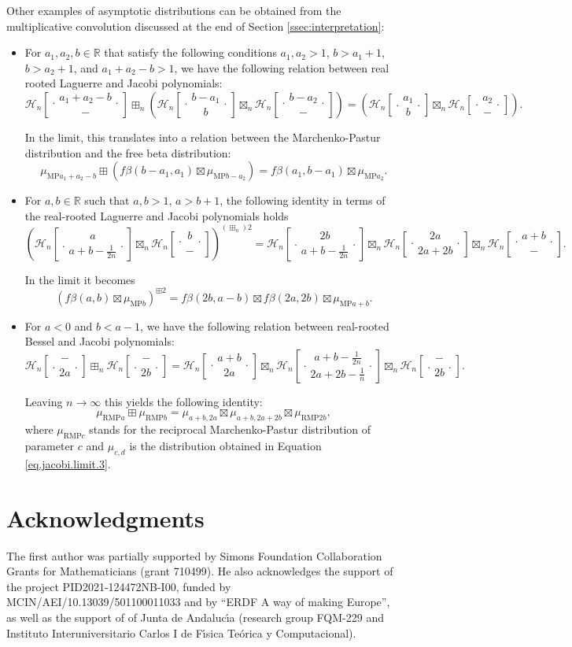 \documentclass[reqno,11pt]{amsart}
\theoremstyle{remark}
\newcommand{\rr}{\mathbb{R}}
\newcommand*\HGP[3]{%
 \mathcal{H}_{#1}{\left[\genfrac..{0pt}{1}{#2}{#3}\right]}%
}
\begin{document}
Other examples of asymptotic distributions can be obtained from the multiplicative convolution discussed at the end of Section \ref{ssec:interpretation}:
\begin{itemize}
\item For $a_1, a_2, b\in \rr$ that satisfy the following conditions $a_1,a_2>1$, $b>a_1+1$, $b>a_2+1$, and $a_1+a_2-b>1$, we have the following relation between  real rooted Laguerre and Jacobi polynomials:
$$\HGP{n}{a_1+a_2-b}{-} \boxplus_n \left(\HGP{n}{b-a_1}{b} \boxtimes_n \HGP{n}{b-a_2}{-}\right) = (\HGP{n}{a_1}{b} \boxtimes_n \HGP{n}{a_2}{-}).$$

In the limit, this translates into a relation between the Marchenko-Pastur distribution and the free beta distribution:
$$\mu_{\text{MP}a_1+a_2-b} \boxplus (f\beta(b-a_1,a_1) \boxtimes \mu_{\text{MP}b-a_2}) = f\beta(a_1,b-a_1) \boxtimes \mu_{\text{MP}a_2}.$$

\item 
For $a, b\in \rr$ such that $a,b>1$, $a>b+1$, the following identity in terms of the real-rooted Laguerre and Jacobi polynomials holds
$$\left( \HGP{n}{a}{a+b-\tfrac{1}{2n}} \boxtimes_n \HGP{n}{b}{-}  \right) ^{(\boxplus_n) 2}  = \HGP{n}{2b}{a+b-\tfrac{1}{2n}} \boxtimes_n \HGP{n}{2a}{2a+2b} \boxtimes_n  \HGP{n}{a+b}{-}.$$

In the limit it becomes  
$$ 
(f\beta(a,b)\boxtimes \mu_{\text{MP}b} )^{\boxplus 2} = f\beta(2b,a-b) \boxtimes f\beta(2a,2b) \boxtimes \mu_{\text{MP}a+b}.
$$

\item For $a<0$ and $b<a-1$, we have the following relation between real-rooted Bessel and Jacobi polynomials:
$$\HGP{n}{-}{2a} \boxplus_n \HGP{n}{-}{2b} = \HGP{n}{a+b}{2a}\boxtimes_n \HGP{n}{a+b-\tfrac{1}{2n}}{2a+2b-\tfrac{1}{n}} \boxtimes_n \HGP{n}{-}{2b}.$$

Leaving $n\to \infty$ this yields the following identity:
$$\mu_{\text{RMP}a} \boxplus \mu_{\text{RMP}b} = \mu_{a+b,2a} \boxtimes \mu_{a+b, 2a+2b} \boxtimes \mu_{\text{RMP}2b},$$
where $\mu_{\text{RMP}c}$ stands for the reciprocal Marchenko-Pastur distribution of parameter $c$ and $\mu_{c,d}$ is the distribution obtained in Equation \eqref{eq.jacobi.limit.3}.
\end{itemize}


 \section*{Acknowledgments}


The first author was partially supported by Simons Foundation Collaboration Grants for Mathematicians (grant 710499).
He also acknowledges the support of the project PID2021-124472NB-I00, funded by MCIN/AEI/10.13039/501100011033 and by ``ERDF A way of making Europe'', as well as the support of of Junta de Andaluc\'{\i}a (research group FQM-229 and Instituto Interuniversitario Carlos I de F\'{\i}sica Te\'orica y Computacional). 
\end{document}
